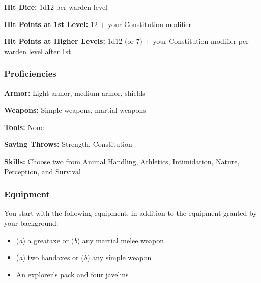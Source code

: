 \textbf{Hit Dice:} 1d12 per warden level

\textbf{Hit Points at 1st Level:} 12 + your Constitution modifier

\textbf{Hit Points at Higher Levels:} 1d12 (or 7) + your Constitution modifier per warden level after 1st

\subsubsection{Proficiencies}

\textbf{Armor:} Light armor, medium armor, shields

\textbf{Weapons:} Simple weapons, martial weapons

\textbf{Tools:} None

\textbf{Saving Throws:} Strength, Constitution

\textbf{Skills:} Choose two from Animal Handling, Athletics, Intimidation, Nature, Perception, and Survival

\subsubsection{Equipment}

You start with the following equipment, in addition to the equipment granted by your background:

\begin{itemize}
\item  (\textit{a}) a greataxe or (\textit{b}) any martial melee weapon
\item  (\textit{a}) two handaxes or (\textit{b}) any simple weapon
\item  An explorer's pack and four javelins
\end{itemize}


